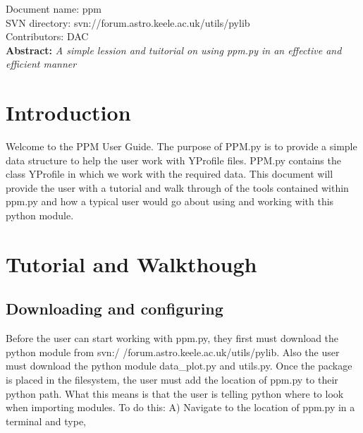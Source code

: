 \renewcommand{\ndoctitle}{ppm.py: The YProfile Data Structure Tool} 
\renewcommand{\ndocname}{ppm}                      
\renewcommand{\svndir}{svn://forum.astro.keele.ac.uk/utils/pylib}  
\renewcommand{\ndoccontribs}{DAC}



Document name: \ndocname \\
SVN directory: \svndir\\
Contributors: \ndoccontribs\\



{  \textbf{Abstract:} \slshape
A simple lession and tuitorial on using ppm.py in an effective and efficient manner
}

\section{Introduction}
Welcome to the PPM User Guide.  The purpose of PPM.py is
to provide a simple data structure to help the user work with YProfile files. 
PPM.py contains the class YProfile in which we work with the required data.
This document will provide the user with a 
tutorial and walk through of the tools contained within ppm.py and
how a typical user would go about using and working with this python module. 
\section{Tutorial and Walkthough}

\subsection{Downloading and configuring}
Before the user can start working with ppm.py, they first must download the python 
module from svn:/ /forum.astro.keele.ac.uk/utils/pylib.  Also the user must download the python module data\_plot.py and utils.py. Once the package is placed in the filesystem, the user must add the location
of ppm.py to their python path.  What this means is that the user is telling python where to look when importing modules.
To do this:
\newline
A) Navigate to the location of ppm.py in a terminal and type,

